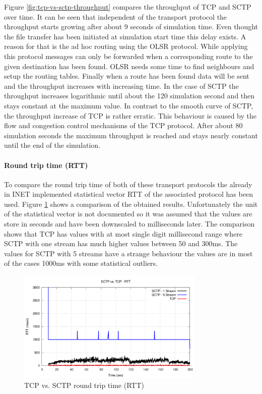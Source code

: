 \documentclass[a4paper]{article}
\begin{document}
Figure \ref{fig:tcp-vs-sctp-throughput} compares the throughput of TCP and SCTP over time. It can be seen that independent of the transport protocol the throughput starts growing after about 9 seconds of simulation time. Even thought the file transfer has been initiated at simulation start time this delay exists. A reason for that is the ad hoc routing using the OLSR protocol. While applying this protocol messages can only be forwarded when a corresponding route to the given destination has been found. OLSR needs some time to find neighbours and setup the routing tables. 
Finally when a route has been found data will be sent and the throughput increases with increasing time. In the case of SCTP the throughput increases logarithmic until about the 120 simulation second and then stays constant at the maximum value. In contrast to the smooth curve of SCTP, the throughput increase of TCP is rather erratic. This behaviour is caused by the flow and congestion control mechanisms of the TCP protocol. After about 80 simulation seconds the maximum throughput is reached and stays nearly constant until the end of the simulation.

\paragraph{Round trip time (RTT)}

To compare the round trip time of both of these transport protocols the already in INET implemented statistical vector RTT of the associated protocol has been used.
Figure \ref{fig:tcp-vs-sctp-rtt} shows a comparison of the obtained results. Unfortunately the unit of the statistical vector is not documented so it was assumed that the values are store in seconds and have been downscaled to milliseconds later.
The comparison shows that TCP has values with at most single digit millisecond range where SCTP with one stream has much higher values between 50 and 300ms. The values for SCTP with 5 streams have a strange behaviour the values are in most of the cases 1000ms with some statistical outliers. 

\begin{figure}[H]
	\centering
	\includegraphics[width=0.8\textwidth]{imgs/sctp-vs-tcp-rtt.png}
	\caption{TCP vs. SCTP round trip time (RTT)}
	\label{fig:tcp-vs-sctp-rtt}
\end{figure}
\end{document}
